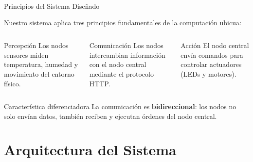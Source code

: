 \documentclass[aspectratio=169]{beamer}
\begin{document}
\begin{frame}{Principios del Sistema Dise\~nado}

Nuestro sistema aplica tres principios fundamentales de la computaci\'on ubicua:

\vspace{0.5em}
\begin{columns}
\begin{exampleblock}{Percepci\'on}
Los nodos sensores miden temperatura, humedad y movimiento del entorno f\'isico.
\end{exampleblock}

\begin{exampleblock}{Comunicaci\'on}
Los nodos intercambian informaci\'on con el nodo central mediante el protocolo HTTP.
\end{exampleblock}

\begin{exampleblock}{Acci\'on}
El nodo central env\'ia comandos para controlar actuadores (LEDs y motores).
\end{exampleblock}
\end{columns}

\vspace{1em}
\begin{alertblock}{Caracter\'istica diferenciadora}
La comunicaci\'on es \textbf{bidireccional}: los nodos no solo env\'ian datos,
tambi\'en reciben y ejecutan \'ordenes del nodo central.
\end{alertblock}
\end{frame}

\section{Arquitectura del Sistema}
\end{document}
